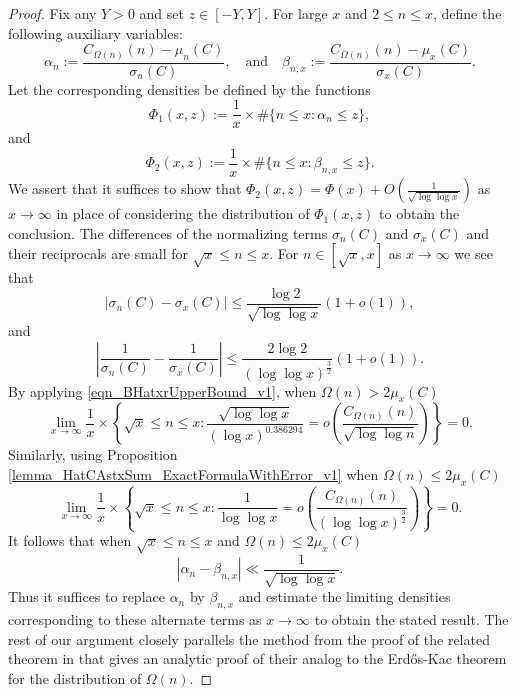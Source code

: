 \documentclass[11pt,reqno,a4letter]{article}
\numberwithin{figure}{section}
\numberwithin{table}{section}
\theoremstyle{plain}
\numberwithin{theorem}{section}
\theoremstyle{definition}
\begin{document}
\begin{proof} 
Fix any $Y > 0$ and set $z \in [-Y, Y]$. 
For large $x$ and $2 \leq n \leq x$, define the following auxiliary variables: 
\[
\alpha_n := \frac{C_{\Omega(n)}(n) - \mu_n(C)}{\sigma_n(C)}, \quad\mathrm{and}\quad 
     \beta_{n,x} := \frac{C_{\Omega(n)}(n) - \mu_x(C)}{\sigma_x(C)}. 
\] 
Let the corresponding densities be defined by the functions 
\[
\Phi_1(x, z) := \frac{1}{x} \times \#\{n \leq x: \alpha_n \leq z\}, 
\]
and 
\[
\Phi_2(x, z) := \frac{1}{x} \times \#\{n \leq x: \beta_{n,x} \leq z\}. 
\] 
We assert that it suffices to show that $\Phi_2(x, z) = \Phi(x) + O\left(\frac{1}{\sqrt{\log\log x}}\right)$ as 
$x \rightarrow \infty$ in place of considering the distribution of 
$\Phi_1(x, z)$ to obtain the conclusion. 
The differences of the normalizing terms $\sigma_n(C)$ and $\sigma_x(C)$ and their 
reciprocals are small for $\sqrt{x} \leq n \leq x$. For $n \in [\sqrt{x}, x]$ 
as $x \rightarrow \infty$ we see that 
\[
|\sigma_n(C) - \sigma_x(C)| \leq 
     \frac{\log 2}{\sqrt{\log\log x}}(1 + o(1)), 
\]
and 
\[
\left\lvert \frac{1}{\sigma_n(C)} - \frac{1}{\sigma_x(C)} \right\rvert 
     \leq \frac{2\log 2}{(\log\log x)^{\frac{3}{2}}}(1 + o(1)). 
\]
By applying \eqref{eqn_BHatxrUpperBound_v1}, when $\Omega(n) > 2\mu_x(C)$ 
\[
\lim_{x \rightarrow \infty} \frac{1}{x} \times 
     \left\{\sqrt{x} \leq n \leq x: 
     \frac{\sqrt{\log\log x}}{(\log x)^{0.386294}} = 
     o\left(\frac{C_{\Omega(n)}(n)}{\sqrt{\log\log n}}\right) 
     \right\} = 0.  
\]
Similarly, using 
Proposition \ref{lemma_HatCAstxSum_ExactFormulaWithError_v1} when 
$\Omega(n) \leq 2 \mu_x(C)$ 
\[
\lim_{x \rightarrow \infty} \frac{1}{x} \times 
     \left\{\sqrt{x} \leq n \leq x: 
     \frac{1}{\log\log x} = 
     o\left(\frac{C_{\Omega(n)}(n)}{(\log\log x)^{\frac{3}{2}}}\right) 
     \right\} = 0. 
\]
It follows that when $\sqrt{x} \leq n \leq x$ and $\Omega(n) \leq 2 \mu_x(C)$ 
\[
\left\lvert \alpha_n - \beta_{n,x} \right\rvert \ll \frac{1}{\sqrt{\log\log x}}. 
\]
Thus it suffices to replace $\alpha_n$ by $\beta_{n,x}$ and estimate the limiting 
densities corresponding to these alternate terms as $x \rightarrow \infty$ to 
obtain the stated result. 
The rest of our argument closely parallels the 
method from the proof of the related theorem in 
\cite[Thm.\ 7.21; \S 7.4]{MV} that gives an analytic proof of their analog to the  
Erd\H{o}s-Kac theorem for the distribution of $\Omega(n)$. 


\end{proof}
\end{document}
